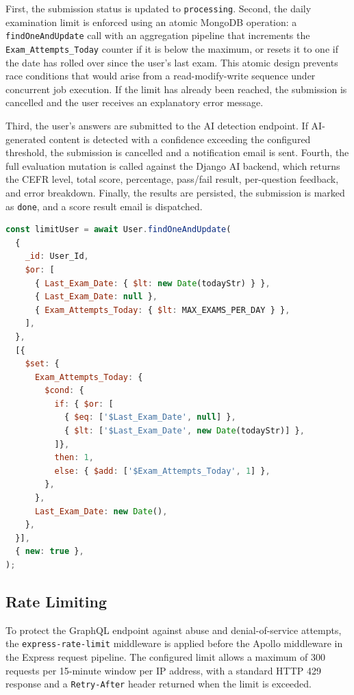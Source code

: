 \documentclass[12pt, a4paper]{report}
\begin{document}
First, the submission status is updated to \texttt{processing}. Second, the daily examination limit is enforced using an atomic MongoDB operation: a \texttt{findOneAndUpdate} call with an aggregation pipeline that increments the \texttt{Exam\_Attempts\_Today} counter if it is below the maximum, or resets it to one if the date has rolled over since the user's last exam. This atomic design prevents race conditions that would arise from a read-modify-write sequence under concurrent job execution. If the limit has already been reached, the submission is cancelled and the user receives an explanatory error message.

Third, the user's answers are submitted to the AI detection endpoint. If AI-generated content is detected with a confidence exceeding the configured threshold, the submission is cancelled and a notification email is sent. Fourth, the full evaluation mutation is called against the Django AI backend, which returns the CEFR level, total score, percentage, pass/fail result, per-question feedback, and error breakdown. Finally, the results are persisted, the submission is marked as \texttt{done}, and a score result email is dispatched.

\begin{lstlisting}[language=JavaScript, caption={Atomic daily limit enforcement in the examination worker.}]
const limitUser = await User.findOneAndUpdate(
  {
    _id: User_Id,
    $or: [
      { Last_Exam_Date: { $lt: new Date(todayStr) } },
      { Last_Exam_Date: null },
      { Exam_Attempts_Today: { $lt: MAX_EXAMS_PER_DAY } },
    ],
  },
  [{
    $set: {
      Exam_Attempts_Today: {
        $cond: {
          if: { $or: [
            { $eq: ['$Last_Exam_Date', null] },
            { $lt: ['$Last_Exam_Date', new Date(todayStr)] },
          ]},
          then: 1,
          else: { $add: ['$Exam_Attempts_Today', 1] },
        },
      },
      Last_Exam_Date: new Date(),
    },
  }],
  { new: true },
);
\end{lstlisting}

\subsection{Rate Limiting}

To protect the GraphQL endpoint against abuse and denial-of-service attempts, the \texttt{express-rate-limit} middleware is applied before the Apollo middleware in the Express request pipeline. The configured limit allows a maximum of 300 requests per 15-minute window per IP address, with a standard HTTP 429 response and a \texttt{Retry-After} header returned when the limit is exceeded.
\end{document}
